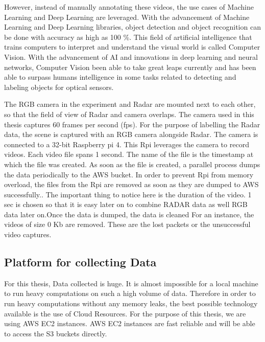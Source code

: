 However, instead of manually annotating these videos, the use cases of Machine Learning and Deep Learning are leveraged. With the advancement of Machine Learning and Deep Learning libraries, object detection and object recognition can be done with accuracy as high as 100 \%. This field of artificial intelligence that trains computers to interpret and understand the visual world is called Computer Vision. With the advancement of AI and innovations in deep learning and neural networks, Computer Vision been able to take great leaps currently and has been able to surpass humans intelligence in some tasks related to detecting and labeling objects for optical sensors.


The RGB camera in the experiment and Radar are mounted next to each other, so that the field of view of Radar and camera overlaps. The camera used in this thesis captures 60 frames per second (fps). For the purpose of labelling the Radar data, the scene is captured with an RGB camera alongside Radar. The camera is connected to a 32-bit Raspberry pi 4. This Rpi leverages the camera to record videos. Each video file spans 1 second. The name of the file is the timestamp at which the file was created. As soon as the file is created, a parallel process dumps the data periodically to the AWS bucket. In order to prevent Rpi from memory overload, the files from the Rpi are removed as soon as they are dumped to AWS successfully.. The important thing to notice here is the duration of the video. 1 sec is chosen so that it is easy later on to combine RADAR data as well RGB data later on.Once the data is dumped, the data is cleaned For an instance, the videos of size 0 Kb are removed. These are the lost packets or the unsuccessful video captures.

\subsection{Platform for collecting Data}
For this thesis, Data collected is huge. It is almost impossible for a local machine to run heavy computations on such a high volume of data. Therefore in order to run heavy computations without any memory leaks, the best possible technology available is the use of Cloud Resources. For the purpose of this thesis, we are using AWS EC2 instances. AWS EC2 instances are fast reliable and will be able to access the S3 buckets directly. 


